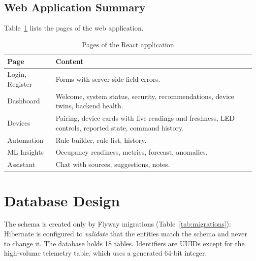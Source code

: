 \documentclass[12pt,a4paper,oneside]{report}
\begin{document}
\section{Web Application Summary}
Table~\ref{tab:pages} lists the pages of the web application.
\begin{table}[H]
\centering
\caption{Pages of the React application}
\label{tab:pages}
\begin{tabularx}{\textwidth}{lX}
\toprule
\textbf{Page} & \textbf{Content}\\
\midrule
Login, Register & Forms with server-side field errors.\\
Dashboard & Welcome, system status, security, recommendations, device twins, backend health.\\
Devices & Pairing, device cards with live readings and freshness, LED controls, reported state, command history.\\
Automation & Rule builder, rule list, history.\\
ML Insights & Occupancy readiness, metrics, forecast, anomalies.\\
Assistant & Chat with sources, suggestions, notes.\\
\bottomrule
\end{tabularx}
\end{table}

\chapter{Database Design}
\label{ch:database}

The schema is created only by Flyway migrations (Table~\ref{tab:migrations}); Hibernate is configured to \emph{validate} that the entities match the schema and never to change it. The database holds 18 tables. Identifiers are UUIDs except for the high-volume telemetry table, which uses a generated 64-bit integer.
\end{document}
